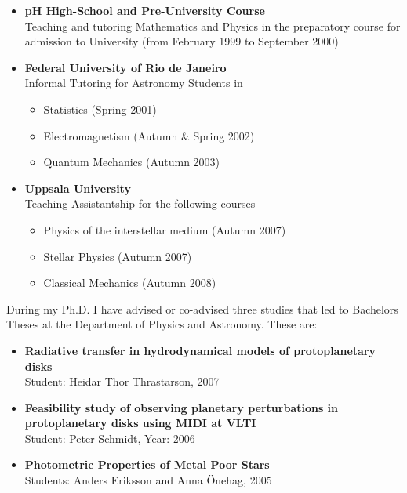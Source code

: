 \documentclass{article}
\newcommand{\hl}[1]{{\large{\sc \underline {#1}}}}
\begin{document}
\begin{itemize}

\item{{\bf pH High-School and Pre-University Course}\\
    Teaching and tutoring Mathematics and Physics in the preparatory course for admission to University (from February 1999 to September 2000)}

\item{{\bf Federal University of Rio de Janeiro}\\
    Informal Tutoring for Astronomy Students in
    \begin{itemize}
     \item{Statistics (Spring 2001)}
     \item{Electromagnetism (Autumn \& Spring 2002)} 
     \item{Quantum Mechanics (Autumn 2003)}
    \end{itemize}}

\item{{\bf Uppsala University}\\
    Teaching Assistantship for the following courses
    \begin{itemize}
    \item{Physics of the interstellar medium (Autumn 2007)}
    \item{Stellar Physics (Autumn 2007)}
    \item{Classical Mechanics (Autumn 2008)}  
    \end{itemize}}
\end{itemize}

\vspace{5mm}

\hspace{-.55cm}\hl{Advising}

\vspace{5mm}

During my Ph.D. I have advised or co-advised three studies that led to Bachelors Theses at the Department of Physics and Astronomy. These are:
\begin{itemize}
\item{{\bf Radiative transfer in hydrodynamical models of protoplanetary disks}\\
Student: Heidar Thor Thrastarson, 2007}

\item{{\bf Feasibility study of observing planetary perturbations in protoplanetary disks using MIDI at VLTI}\\
Student: Peter Schmidt, Year: 2006}

\item{{\bf Photometric Properties of Metal Poor Stars}\\
Students: Anders Eriksson and Anna \"Onehag, 2005}

\end{itemize}
\end{document}
